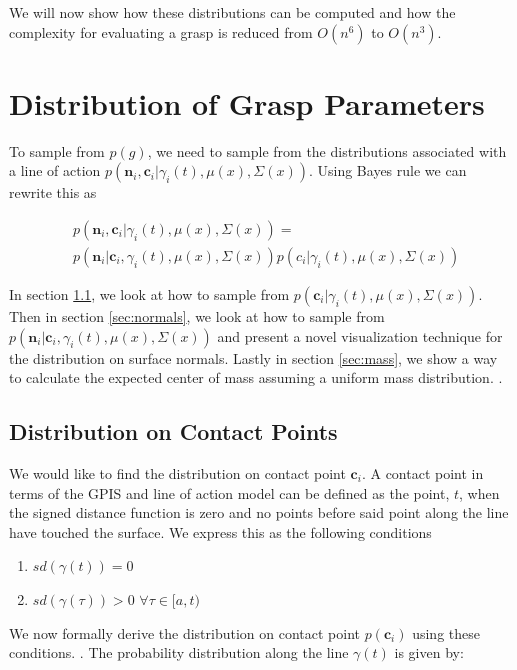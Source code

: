 \documentclass[letterpaper, 10 pt, conference]{ieeeconf}  %
\begin{document}
We will now show how these distributions can be computed and how the complexity for evaluating a grasp is reduced from $O(n^6)$ to $O(n^3)$. 


\section{Distribution of Grasp Parameters}
\label{sec:distgrasp}
 
 To sample from $p(g)$, we need to sample from the distributions associated with a line of action $p(\textbf{n}_i,\textbf{c}_i|\gamma_i(t),\mu(x),\Sigma(x))$. Using Bayes rule we can rewrite this as 
 
 \vspace{-2ex}
 \begin{align*}
 &p(\textbf{n}_i,\textbf{c}_i|\gamma_i(t),\mu(x),\Sigma(x))=\\
 &p(\textbf{n}_i|\textbf{c}_i,\gamma_i(t),\mu(x),\Sigma(x))p(c_i|\gamma_i(t),\mu(x),\Sigma(x))
 \end{align*}
 
 In section \ref{sec:contact}, we look at how to sample from $p(\textbf{c}_i|\gamma_i(t),\mu(x),\Sigma(x))$. Then in section \ref{sec:normals}, we look at how to sample from $p(\textbf{n}_i|\textbf{c}_i,\gamma_i(t),\mu(x),\Sigma(x))$ and present a novel visualization technique for the distribution on surface normals. Lastly in section \ref{sec:mass}, we show a way to calculate the expected center of mass assuming a uniform mass distribution. 
 .
\subsection{Distribution on Contact Points}\label{sec:contact} 
We would like to find the distribution on contact point $\textbf{c}_i$. A contact point in terms of the GPIS and line of action model can be defined as the point, $t$, when the signed distance function is zero and no points before said point along the line have touched the surface. We express this as the following conditions \\

\begin{enumerate}
	\item $sd(\gamma(t)) = 0$
	\item $sd(\gamma(\tau)) > 0$ $\forall \tau \in [a,t)$
\end{enumerate}

We now formally derive the distribution on contact point $p(\textbf{c}_i)$ using these conditions.  
. 
The probability distribution along the line $\gamma(t)$ is given by:
\end{document}
